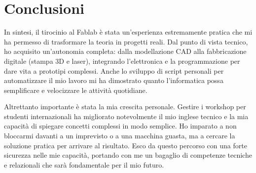 \newpage
\section{Conclusioni}
In sintesi, il tirocinio al Fablab è stata un'esperienza estremamente pratica che mi ha permesso di trasformare la teoria in progetti reali. Dal punto di vista tecnico, ho acquisito un'autonomia completa: dalla modellazione CAD alla fabbricazione digitale (stampa 3D e laser), integrando l'elettronica e la programmazione per dare vita a prototipi complessi. Anche lo sviluppo di script personali per automatizzare il mio lavoro mi ha dimostrato quanto l'informatica possa semplificare e velocizzare le attività quotidiane.

Altrettanto importante è stata la mia crescita personale. Gestire i workshop per studenti internazionali ha migliorato notevolmente il mio inglese tecnico e la mia capacità di spiegare concetti complessi in modo semplice. Ho imparato a non bloccarmi davanti a un imprevisto o a una macchina guasta, ma a cercare la soluzione pratica per arrivare al risultato. Esco da questo percorso con una forte sicurezza nelle mie capacità, portando con me un bagaglio di competenze tecniche e relazionali che sarà fondamentale per il mio futuro.